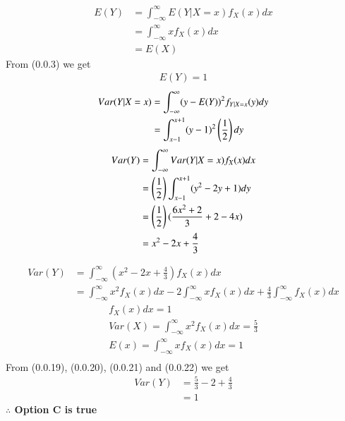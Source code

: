 \documentclass[journal,12pt,twocolumn]{IEEEtran}
\begin{document}
\begin{align}
    E(Y)&=\int_{-\infty}^{\infty}E(Y|X=x)f_{X}(x)dx\\
    &=\int_{-\infty}^{\infty}xf_{X}(x)dx\\
    &=E(X)
\end{align}
From (0.0.3) we get 
\begin{align}
    E(Y)=1
\end{align}
\begin{align}
    Var(Y|X=x)&=\int_{-\infty}^{\infty}(y-E(Y))^2f_{Y|X=x}(y)dy\\
    &=\int_{x-1}^{x+1}(y-1)^2\left(\frac{1}{2}\right)dy
\end{align}
\begin{align}
    Var(Y)&=\int_{-\infty}^{\infty}Var(Y|X=x)f_{X}(x)dx\\
    &=\left(\frac{1}{2}\right)\int_{x-1}^{x+1}(y^2-2y+1)dy\\
    &=\left(\frac{1}{2}\right)(\frac{6x^2+2}{3}+2-4x)\\
    &=x^2-2x+\frac{4}{3}
\end{align}

\begin{align}
    Var(Y)&=\int_{-\infty}^{\infty}(x^2-2x+\frac{4}{3})f_{X}(x)dx\\
    &=\int_{-\infty}^{\infty}x^2f_{X}(x)dx-2\int_{-\infty}^{\infty}xf_{X}(x)dx+\frac{4}{3}\int_{-\infty}^{\infty}f_{X}(x)dx
\end{align}
\begin{align}
  f_{X}(x)dx=1\\
 Var(X)=\int_{-\infty}^{\infty}x^2f_{X}(x)dx=\frac{5}{3}\\
 E(x)=\int_{-\infty}^{\infty}xf_{X}(x)dx=1\\
 \end{align}
 From (0.0.19), (0.0.20), (0.0.21) and (0.0.22) we get
 \begin{align}
     Var(Y)&=\frac{5}{3}-2+\frac{4}{3}\\
     &=1
 \end{align}
\textbf{$\therefore$ Option C is true}
\end{document}
